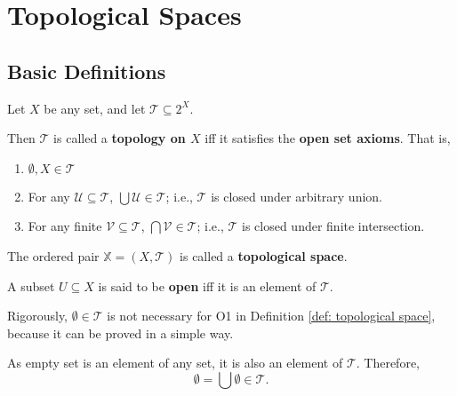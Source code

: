 \chapter{Topological Spaces}


\section{Basic Definitions}


\begin{definition}
	\label{def: topological space}

	Let $X$ be any set, and let $\mathcal T \subseteq 2^X$.
	
	Then $\mathcal T$ is called a \textbf{topology on $X$} iff it satisfies the \textbf{open set axioms}. That is,
	\begin{enumerate}[O1.]
		\item $\emptyset, X \in \mathcal T$
		\item For any $\mathcal U \subseteq \mathcal T$, $\bigcup \mathcal U \in \mathcal T$; i.e., $\mathcal T$ is closed under arbitrary union.
		\item For any finite $\mathcal V \subseteq \mathcal T$, $\bigcap \mathcal V \in \mathcal T$; i.e., $\mathcal T$ is closed under finite intersection.
	\end{enumerate}
	
	The ordered pair $\mathbb X = (X, \mathcal T)$ is called a \textbf{topological space}.
	
	A subset $U \subseteq X$ is said to be \textbf{open} iff it is an element of $\mathcal T$.
\end{definition}


	Rigorously, $\emptyset \in \mathcal T$ is not necessary for O1 in Definition \ref{def: topological space}, because it can be proved in a simple way.
	
	As empty set is an element of any set, it is also an element of $\mathcal T$. Therefore,
	$$
	\emptyset = \bigcup \emptyset \in \mathcal T.
	$$












